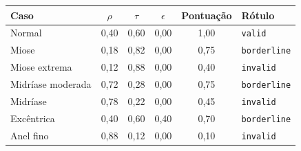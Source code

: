 \begin{tabular}{lccccl}
\toprule
Caso & $\rho$ & $\tau$ & $\epsilon$ & Pontuação & Rótulo \\
\midrule
Normal & 0,40 & 0,60 & 0,00 & 1,00 & \texttt{valid} \\
Miose & 0,18 & 0,82 & 0,00 & 0,75 & \texttt{borderline} \\
Miose extrema & 0,12 & 0,88 & 0,00 & 0,40 & \texttt{invalid} \\
Midríase moderada & 0,72 & 0,28 & 0,00 & 0,75 & \texttt{borderline} \\
Midríase & 0,78 & 0,22 & 0,00 & 0,45 & \texttt{invalid} \\
Excêntrica & 0,40 & 0,60 & 0,40 & 0,70 & \texttt{borderline} \\
Anel fino & 0,88 & 0,12 & 0,00 & 0,10 & \texttt{invalid} \\
\bottomrule
\end{tabular}
